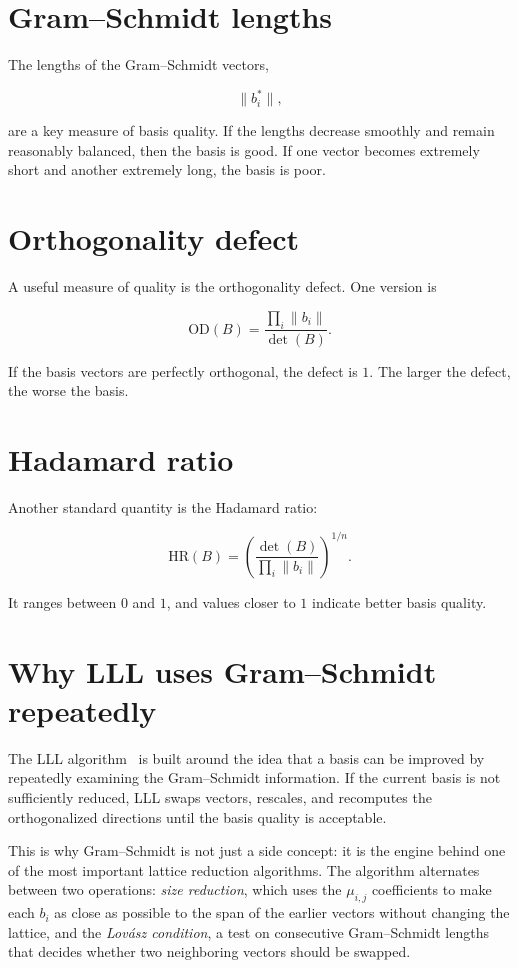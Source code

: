 \section{Gram--Schmidt lengths}
The lengths of the Gram--Schmidt vectors,

\[
\|b_i^*\|,
\]

are a key measure of basis quality. If the lengths decrease smoothly and remain reasonably balanced, then the basis is good. If one vector becomes extremely short and another extremely long, the basis is poor.

\section{Orthogonality defect}
A useful measure of quality is the orthogonality defect. One version is

\[
\mathrm{OD}(B)=\frac{\prod_i \|b_i\|}{\det(B)}.
\]

If the basis vectors are perfectly orthogonal, the defect is $1$. The larger the defect, the worse the basis.

\section{Hadamard ratio}
Another standard quantity is the Hadamard ratio:

\[
\mathrm{HR}(B)=\left(\frac{\det(B)}{\prod_i \|b_i\|}\right)^{1/n}.
\]

It ranges between $0$ and $1$, and values closer to $1$ indicate better basis quality.

\section{Why LLL uses Gram--Schmidt repeatedly}
The LLL algorithm~\cite{lll1982} is built around the idea that a basis can be improved by repeatedly examining the Gram--Schmidt information. If the current basis is not sufficiently reduced, LLL swaps vectors, rescales, and recomputes the orthogonalized directions until the basis quality is acceptable.

This is why Gram--Schmidt is not just a side concept: it is the engine behind one of the most important lattice reduction algorithms. The algorithm alternates between two operations: \emph{size reduction}, which uses the $\mu_{i,j}$ coefficients to make each $b_i$ as close as possible to the span of the earlier vectors without changing the lattice, and the \emph{Lov\'asz condition}, a test on consecutive Gram--Schmidt lengths that decides whether two neighboring vectors should be swapped.

